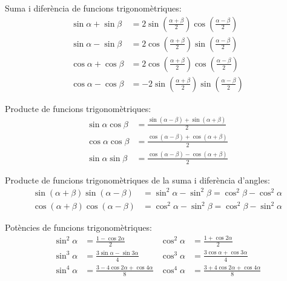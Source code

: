 Suma i diferència de funcions trigonomètriques:
\begin{subequations}
\begin{align}
    \sin\alpha+\sin\beta &= 2 \sin\left(\frac{\alpha+\beta}{2}\right)
    \cos\left(\frac{\alpha-\beta}{2}\right)\\[1ex]
    \sin\alpha-\sin\beta &= 2 \cos\left(\frac{\alpha+\beta}{2}\right)
    \sin\left(\frac{\alpha-\beta}{2}\right)\\[1ex]
    \cos\alpha+\cos\beta &= 2 \cos\left(\frac{\alpha+\beta}{2}\right)
    \cos\left(\frac{\alpha-\beta}{2}\right)\\[1ex]
    \cos\alpha-\cos\beta &= -2 \sin\left(\frac{\alpha+\beta}{2}\right)
    \sin\left(\frac{\alpha-\beta}{2}\right)
\end{align}
\end{subequations}

Producte de funcions trigonomètriques:
\begin{subequations}
\begin{align}
    \sin\alpha \cos\beta &=
    \frac{\sin(\alpha-\beta)+\sin(\alpha+\beta)}{2}\\[1ex]
    \cos\alpha \cos\beta &=
    \frac{\cos(\alpha-\beta)+\cos(\alpha+\beta)}{2}\label{eq:D15b}\\[1ex]
    \sin\alpha \sin\beta &=
    \frac{\cos(\alpha-\beta)-\cos(\alpha+\beta)}{2}
\end{align}
\end{subequations}

Producte de funcions trigonomètriques de la suma i diferència
d'angles:
\begin{subequations}
\begin{align}
    \sin(\alpha+\beta) \sin(\alpha-\beta) &= \sin^2\alpha-\sin^2\beta =
    \cos^2\beta - \cos^2\alpha\\[1ex]
    \cos(\alpha+\beta) \cos(\alpha-\beta) &= \cos^2\alpha-\sin^2\beta =
    \cos^2\beta - \sin^2\alpha
\end{align}
\end{subequations}

Potències de funcions trigonomètriques:
\begin{subequations}
\begin{align}
    \sin^2\alpha &= \frac{1-\cos 2\alpha}{2} &  \cos^2\alpha &= \frac{1+\cos 2\alpha}{2}\\[1ex]
    \sin^3\alpha &= \frac{3\sin\alpha-\sin 3\alpha}{4} &  \cos^3\alpha &= \frac{3\cos\alpha+\cos 3\alpha}{4}\\[1ex]
    \sin^4\alpha &= \frac{3-4\cos 2\alpha+\cos 4\alpha}{8} &  \cos^4\alpha &= \frac{3+4\cos 2\alpha+\cos 4\alpha}{8}
\end{align}
\end{subequations}

